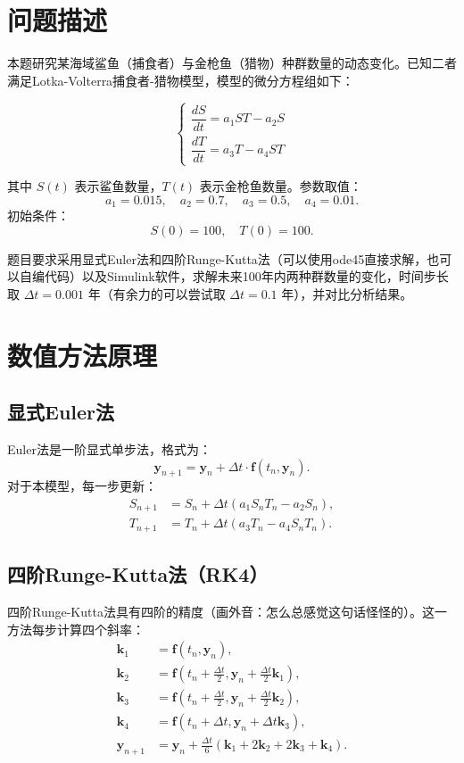 \section{问题描述}

本题研究某海域鲨鱼（捕食者）与金枪鱼（猎物）种群数量的动态变化。已知二者满足Lotka-Volterra捕食者-猎物模型，模型的微分方程组如下：

\[
\begin{cases}
\dfrac{dS}{dt} = a_1 S T - a_2 S \\[1em]
\dfrac{dT}{dt} = a_3 T - a_4 S T
\end{cases}
\]

其中 $S(t)$ 表示鲨鱼数量，$T(t)$ 表示金枪鱼数量。参数取值：
\[
a_1 = 0.015,\quad a_2 = 0.7,\quad a_3 = 0.5,\quad a_4 = 0.01.
\]
初始条件：
\[
S(0) = 100,\quad T(0) = 100.
\]

题目要求采用显式Euler法和四阶Runge-Kutta法（可以使用ode45直接求解，也可以自编代码）以及Simulink软件，求解未来100年内两种群数量的变化，时间步长取 $\Delta t = 0.001$ 年（有余力的可以尝试取 $\Delta t = 0.1$ 年），并对比分析结果。

\section{数值方法原理}

\subsection{显式Euler法}

Euler法是一阶显式单步法，格式为：
\[
\mathbf{y}_{n+1} = \mathbf{y}_n + \Delta t \cdot \mathbf{f}(t_n, \mathbf{y}_n).
\]
对于本模型，每一步更新：
\[
\begin{aligned}
S_{n+1} &= S_n + \Delta t (a_1 S_n T_n - a_2 S_n), \\
T_{n+1} &= T_n + \Delta t (a_3 T_n - a_4 S_n T_n).
\end{aligned}
\]

\subsection{四阶Runge-Kutta法（RK4）}

四阶Runge-Kutta法具有四阶的精度（画外音：怎么总感觉这句话怪怪的）。这一方法每步计算四个斜率：
\[
\begin{aligned}
\mathbf{k}_1 &= \mathbf{f}(t_n, \mathbf{y}_n), \\
\mathbf{k}_2 &= \mathbf{f}(t_n + \tfrac{\Delta t}{2}, \mathbf{y}_n + \tfrac{\Delta t}{2}\mathbf{k}_1), \\
\mathbf{k}_3 &= \mathbf{f}(t_n + \tfrac{\Delta t}{2}, \mathbf{y}_n + \tfrac{\Delta t}{2}\mathbf{k}_2), \\
\mathbf{k}_4 &= \mathbf{f}(t_n + \Delta t, \mathbf{y}_n + \Delta t \mathbf{k}_3), \\
\mathbf{y}_{n+1} &= \mathbf{y}_n + \frac{\Delta t}{6}(\mathbf{k}_1 + 2\mathbf{k}_2 + 2\mathbf{k}_3 + \mathbf{k}_4).
\end{aligned}
\]


